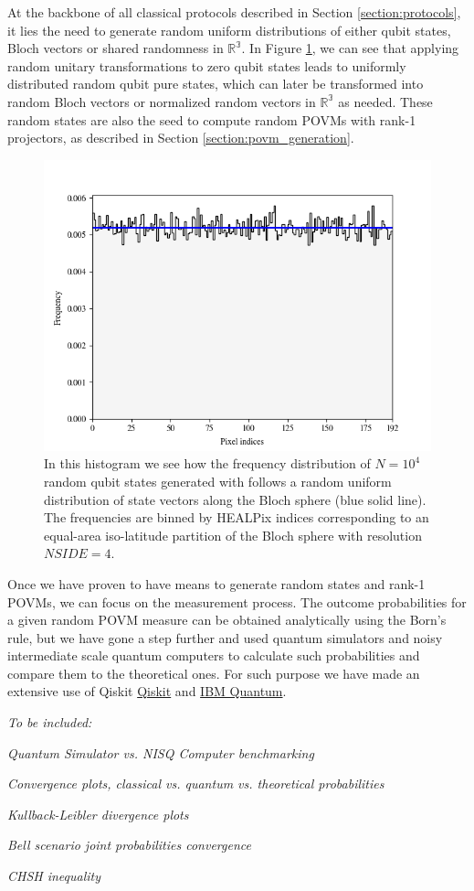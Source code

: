 At the backbone of all classical protocols described in Section \ref{section:protocols}, it lies the need to generate random uniform distributions of either qubit states, Bloch vectors or shared randomness in $\mathbb{R^3}$. In Figure \ref{fig:results_random_states}, we can see that applying random unitary transformations to zero qubit states leads to uniformly distributed random qubit pure states, which can later be transformed into random Bloch vectors or normalized random vectors in $\mathbb{R^3}$ as needed. These random states are also the seed to compute random POVMs with rank-1 projectors, as described in Section \ref{section:povm_generation}.
\begin{figure}[h]
\centering
\includegraphics[width=\textwidth]{images/random_bloch_healpix.png}
\caption{In this histogram we see how the frequency distribution of $N=10^4$ random qubit states generated with \cite{software2023} follows a random uniform distribution of state vectors along the Bloch sphere (blue solid line). The frequencies are binned by HEALPix indices corresponding to an equal-area iso-latitude partition of the Bloch sphere with resolution $\mathit{NSIDE}=4$.}
\label{fig:results_random_states}
\end{figure}

Once we have proven to have means to generate random states and rank-1 POVMs, we can focus on the measurement process. The outcome probabilities for a given random POVM measure can be obtained analytically using the Born's rule, but we have gone a step further and used quantum simulators and noisy intermediate scale quantum computers to calculate such probabilities and compare them to the theoretical ones. For such purpose we have made an extensive use of Qiskit \href{https://qiskit.org/}{Qiskit} and \href{https://quantum-computing.ibm.com}{IBM Quantum}.

\textit{To be included:}

\textit{Quantum Simulator vs. NISQ Computer benchmarking}

\textit{Convergence plots, classical vs. quantum vs. theoretical probabilities}

\textit{Kullback-Leibler divergence plots}

\textit{Bell scenario joint probabilities convergence}

\textit{CHSH inequality}